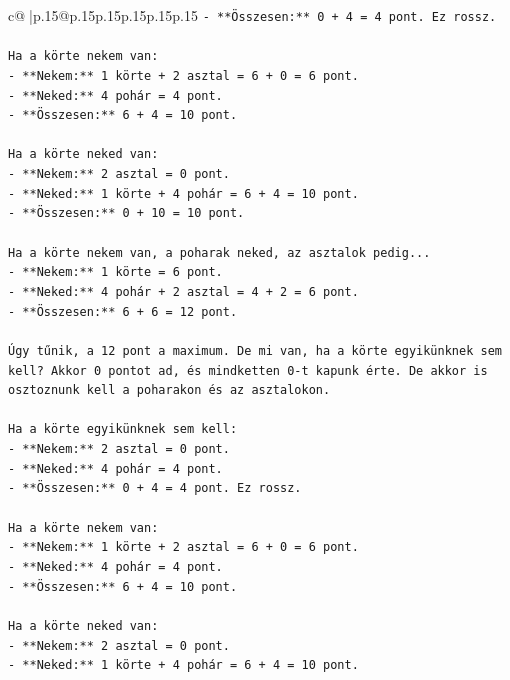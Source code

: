\documentclass{article}
\begin{document}
{\begin{supertabular}{c@{$\;$}|p{.15\linewidth}@{}p{.15\linewidth}p{.15\linewidth}p{.15\linewidth}p{.15\linewidth}p{.15\linewidth}}
{{{\texttt{{-} **Összesen:** 0 + 4 = 4 pont. Ez rossz.} \\
\\ 
\texttt{Ha a körte nekem van:} \\
\texttt{{-} **Nekem:** 1 körte + 2 asztal = 6 + 0 = 6 pont.} \\
\texttt{{-} **Neked:** 4 pohár = 4 pont.} \\
\texttt{{-} **Összesen:** 6 + 4 = 10 pont.} \\
\\ 
\texttt{Ha a körte neked van:} \\
\texttt{{-} **Nekem:** 2 asztal = 0 pont.} \\
\texttt{{-} **Neked:** 1 körte + 4 pohár = 6 + 4 = 10 pont.} \\
\texttt{{-} **Összesen:** 0 + 10 = 10 pont.} \\
\\ 
\texttt{Ha a körte nekem van, a poharak neked, az asztalok pedig...} \\
\texttt{{-} **Nekem:** 1 körte = 6 pont.} \\
\texttt{{-} **Neked:** 4 pohár + 2 asztal = 4 + 2 = 6 pont.} \\
\texttt{{-} **Összesen:** 6 + 6 = 12 pont.} \\
\\ 
\texttt{Úgy tűnik, a 12 pont a maximum. De mi van, ha a körte egyikünknek sem kell? Akkor 0 pontot ad, és mindketten 0{-}t kapunk érte. De akkor is osztoznunk kell a poharakon és az asztalokon.} \\
\\ 
\texttt{Ha a körte egyikünknek sem kell:} \\
\texttt{{-} **Nekem:** 2 asztal = 0 pont.} \\
\texttt{{-} **Neked:** 4 pohár = 4 pont.} \\
\texttt{{-} **Összesen:** 0 + 4 = 4 pont. Ez rossz.} \\
\\ 
\texttt{Ha a körte nekem van:} \\
\texttt{{-} **Nekem:** 1 körte + 2 asztal = 6 + 0 = 6 pont.} \\
\texttt{{-} **Neked:** 4 pohár = 4 pont.} \\
\texttt{{-} **Összesen:** 6 + 4 = 10 pont.} \\
\\ 
\texttt{Ha a körte neked van:} \\
\texttt{{-} **Nekem:** 2 asztal = 0 pont.} \\
\texttt{{-} **Neked:** 1 körte + 4 pohár = 6 + 4 = 10 pont.} \\
}}}
\end{supertabular}}
\end{document}
